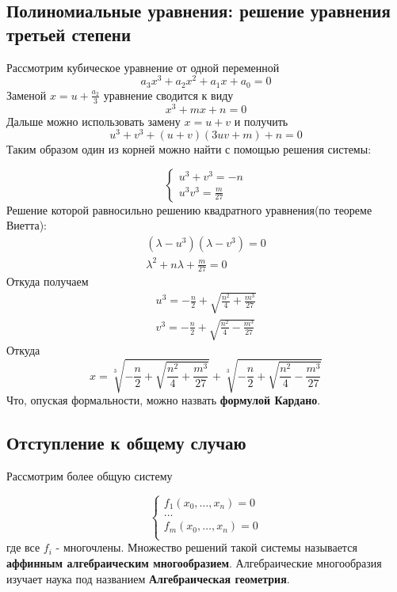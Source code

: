 \documentclass{article}
\begin{document}
\subsection{Полиномиальные уравнения: решение уравнения третьей степени}

Рассмотрим кубическое уравнение от одной переменной 
\begin{equation*}
a_3 x^3 + a_2 x^2 + a_1 x + a_0 = 0 
\end{equation*}
Заменой $x = u + \frac{a_2}{3}$ уравнение сводится к виду
\begin{equation*}
x^3 + mx + n = 0
\end{equation*}
Дальше можно использовать замену $x = u + v$ и получить
\begin{equation*}
u^3 + v^3 + (u+v)(3uv + m) + n = 0
\end{equation*}
Таким образом один из корней можно найти с помощью решения системы:

\begin{equation*}
    \begin{cases}
        u^3 + v^3 = -n \\
        u^3v^3 = \frac{m}{27}
    \end{cases}        
\end{equation*}
Решение которой равносильно решению квадратного уравнения(по теореме Виетта):
\begin{gather*}
(\lambda - u^3)(\lambda - v^3) = 0 \\
\lambda^2 + n\lambda + \frac{m}{27} = 0
\end{gather*}
Откуда получаем 
\begin{gather*}
u^3 = -\frac{n}{2} + \sqrt{\frac{n^2}{4} + \frac{m^3}{27}} \\
v^3 = -\frac{n}{2} + \sqrt{\frac{n^2}{4} - \frac{m^3}{27}}
\end{gather*}
Откуда 
\begin{equation*}
x = \sqrt[3]{-\frac{n}{2} + \sqrt{\frac{n^2}{4} + \frac{m^3}{27}}} + \sqrt[3]{-\frac{n}{2} + \sqrt{\frac{n^2}{4} - \frac{m^3}{27}}}
\end{equation*}
Что, опуская формальности, можно назвать \textbf{формулой Кардано}.

\subsection{Отступление к общему случаю}
Рассмотрим более общую систему

\begin{equation*}
    \begin{cases}
     f_1(x_0, \dots,  x_n) = 0 \\
     \dots \\
     f_m(x_0, \dots,  x_n) = 0 \\
    \end{cases}
\end{equation*}
где все $f_i$ - многочлены.  
Множество решений такой системы называется \textbf{аффинным алгебраическим многообразием}.
Алгебраические многообразия изучает наука под названием \textbf{Алгебраическая геометрия}.
\end{document}
